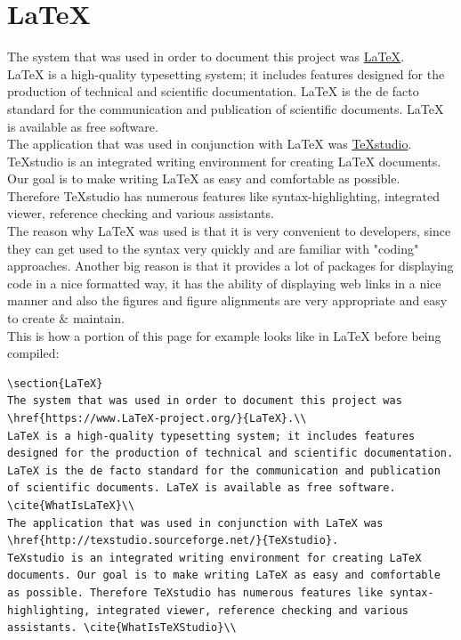 \section{LaTeX}
The system that was used in order to document this project was \href{https://www.LaTeX-project.org/}{LaTeX}.\\
LaTeX is a high-quality typesetting system; it includes features designed for the production of technical and scientific documentation. LaTeX is the de facto standard for the communication and publication of scientific documents. LaTeX is available as free software. \cite{WhatIsLaTeX}\\
The application that was used in conjunction with LaTeX was \href{http://texstudio.sourceforge.net/}{TeXstudio}.
TeXstudio is an integrated writing environment for creating LaTeX documents. Our goal is to make writing LaTeX as easy and comfortable as possible. Therefore TeXstudio has numerous features like syntax-highlighting, integrated viewer, reference checking and various assistants. \cite{WhatIsTeXStudio}\\
The reason why LaTeX was used is that it is very convenient to developers, since they can get used to the syntax very quickly and are familiar with "coding" approaches. Another big reason is that it provides a lot of packages for displaying code in a nice formatted way, it has the ability of displaying web links in a nice manner and also the figures and figure alignments are very appropriate and easy to create \& maintain.\\
\newline
This is how a portion of this page for example looks like in LaTeX before being compiled:
\begin{verbatim}
\section{LaTeX}
The system that was used in order to document this project was \href{https://www.LaTeX-project.org/}{LaTeX}.\\
LaTeX is a high-quality typesetting system; it includes features designed for the production of technical and scientific documentation. LaTeX is the de facto standard for the communication and publication of scientific documents. LaTeX is available as free software. \cite{WhatIsLaTeX}\\
The application that was used in conjunction with LaTeX was \href{http://texstudio.sourceforge.net/}{TeXstudio}.
TeXstudio is an integrated writing environment for creating LaTeX documents. Our goal is to make writing LaTeX as easy and comfortable as possible. Therefore TeXstudio has numerous features like syntax-highlighting, integrated viewer, reference checking and various assistants. \cite{WhatIsTeXStudio}\\
\end{verbatim}

